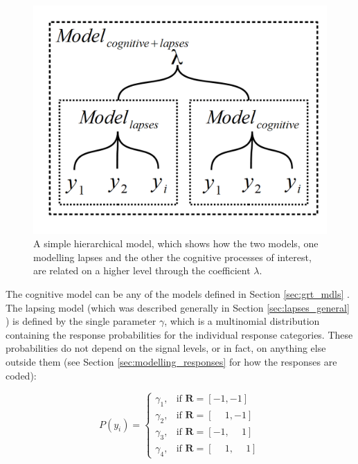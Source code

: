 \documentclass{article}\usepackage{knitr}
\begin{document}
\begin{figure}[!htb]
\begin{center}
\includegraphics[scale=0.75]{Basic_hierarchical_mixture_model}
\end{center}
\caption{A simple hierarchical model, which shows how the two models, one modelling lapses and the other the cognitive processes of interest, are related on a higher level through the coefficient $\lambda$.}
\label{fig:Basic_hierarchical_model}
\end{figure}

The cognitive model can be any of the models defined in Section \ref{sec:grt_mdls} \textit{}. The lapsing model (which was described generally in Section \ref{sec:lapses_general} \textit{}) is defined by the single parameter $\gamma$, which is a multinomial distribution containing the response probabilities for the individual response categories. These probabilities do not depend on the signal levels, or in fact, on anything else outside them (see Section \ref{sec:modelling_responses} \textit{} for how the responses are coded):

\begin{equation}
P(y_i)=
\begin{cases}
  \gamma_1, & \text{if } \bm{R} = [-1, -1]\\
  \gamma_2, & \text{if } \bm{R} = [\phantom{-}1, -1]\\
  \gamma_3, & \text{if } \bm{R} = [-1, \phantom{-}1]\\
  \gamma_4, & \text{if } \bm{R} = [\phantom{-}1, \phantom{-}1]
\end{cases}
\end{equation}
\end{document}
